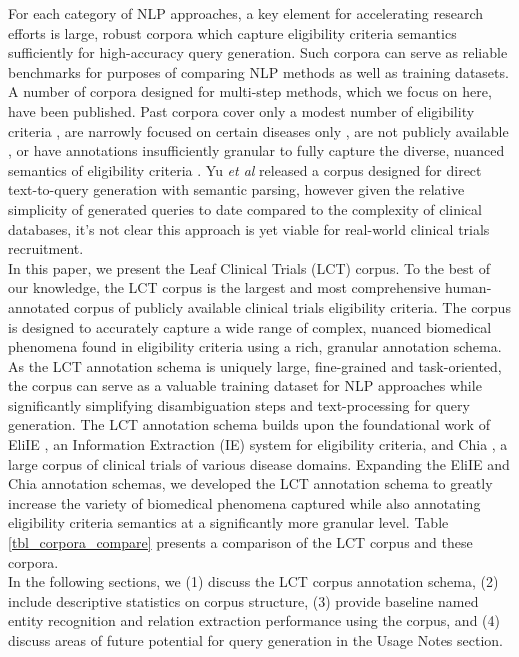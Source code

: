 \documentclass[../main.tex]{subfiles}
\begin{document}
\noindent For each category of NLP approaches, a key element for accelerating research efforts is large, robust corpora which capture eligibility criteria semantics sufficiently for high-accuracy query generation. Such corpora can serve as reliable benchmarks for purposes of comparing NLP methods as well as training datasets. A number of corpora designed for multi-step methods, which we focus on here, have been published. Past corpora cover only a modest number of eligibility criteria \cite{weng2011elixr}, are narrowly focused on certain diseases only \cite{kang2017eliie}, are not publicly available \cite{tu2011, milian2015enhancing}, or have annotations insufficiently granular to fully capture the diverse, nuanced semantics of eligibility criteria \cite{kury2020chia}. Yu \textit{et al} \cite{yu2020} released a corpus designed for direct text-to-query generation with semantic parsing, however given the relative simplicity of generated queries to date compared to the complexity of clinical databases, it's not clear this approach is yet viable for real-world clinical trials recruitment.  \\

\noindent In this paper, we present the Leaf Clinical Trials (LCT) corpus. To the best of our knowledge, the LCT corpus is the largest and most comprehensive human-annotated corpus of publicly available clinical trials eligibility criteria. The corpus is designed to accurately capture a wide range of complex, nuanced biomedical phenomena found in eligibility criteria using a rich, granular annotation schema. As the LCT annotation schema is uniquely large, fine-grained and task-oriented, the corpus can serve as a valuable training dataset for NLP approaches while significantly simplifying disambiguation steps and text-processing for query generation. The LCT annotation schema builds upon the foundational work of EliIE \cite{kang2017eliie}, an Information Extraction (IE) system for eligibility criteria, and Chia \cite{kury2020chia}, a large corpus of clinical trials of various disease domains. Expanding the EliIE and Chia annotation schemas, we developed the LCT annotation schema to greatly increase the variety of biomedical phenomena captured while also annotating eligibility criteria semantics at a significantly more granular level. Table \ref{tbl_corpora_compare} presents a comparison of the LCT corpus and these corpora. \\

\noindent In the following sections, we (1) discuss the LCT corpus annotation schema, (2) include descriptive statistics on corpus structure, (3) provide baseline named entity recognition and relation extraction performance using the corpus, and (4) discuss areas of future potential for query generation in the Usage Notes section.
\end{document}
